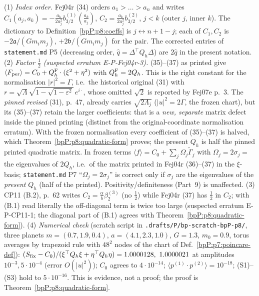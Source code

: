 \begin{remark}\label{bpP:p8:factor-half}\label{bpP:p8:dictionary}
(1) \emph{Index order.} Fej04r (34) orders $a_1>\dots>a_n$ and writes $C_1(a_j,a_k)=-\frac{a_k}{2a_j^2}b_{3/2}^{(1)}(\frac{a_k}{a_j})$, $C_2=\frac{a_k}{2a_j^2}b_{3/2}^{(2)}$, $j<k$ (outer $j$, inner $k$). The dictionary to Definition~\ref{bpP:p8:coeffs} is $j\leftrightarrow n+1-j$; each of $C_1,C_2$ is $-2\mathfrak a/(Gm_im_j)$, $+2\mathfrak b/(Gm_im_j)$ for the pair. The corrected entries of \texttt{statement.md} P5 (decreasing order, $\hat q=\Delta^{\top}Q_h\Delta$) are $2\hat q$ in the present notation.
(2) \emph{Factor $\tfrac12$ (suspected erratum E-P-Fej04r-3).} (35)--(37) as printed give $\langle F_{\rm per}\rangle=C_0+Q^{\rm F}_h\cdot(\xi^2+\eta^2)$ with $Q_h^{\rm F}=2Q_h$. This is the right constant for the normalisation $|r|^2=\Gamma$, i.e.\ the historical original (31) with $r=\sqrt{\Lambda}\sqrt{1-\sqrt{1-\varepsilon^2}}\,e^{i\cdot}$, whose omitted $\sqrt2$ is reported by Fej07e p.~3. The \emph{pinned revised} (31), p.~47, already carries $\sqrt{2\Lambda_j}$ ($|u|^2=2\Gamma$, the frozen chart), but its (35)--(37) retain the larger coefficients: that is a \emph{new, separate} matrix defect inside the pinned printing (distinct from the original-coordinate normalisation erratum). With the frozen normalisation every coefficient of (35)--(37) is halved, which Theorem~\ref{bpP:p8:quadratic-form} proves; the present $Q_h$ is half the pinned printed quadratic matrix. In frozen terms $\langle f\rangle=C_0+\sum_j\Omega_j\tilde\Gamma_j$ with $\Omega_j=2\sigma_j=$ the eigenvalues of $2Q_h$, i.e.\ of the matrix printed in Fej04r (36)--(37) in the $\xi$-basis; \texttt{statement.md} P7 ``$\Omega_j=2\sigma_j$'' is correct only if $\sigma_j$ are the eigenvalues of the \emph{present} $Q_h$ (half of the printed). Positivity/definiteness (Part~9) is unaffected.
(3) CP11 (B.2), p.~62 writes $C_2=\frac\alpha b\beta_2^{(3)}$ (no $\tfrac12$) while Fej04r (37) has $\tfrac12$ in $C_2$; with (B.1) read literally the off-diagonal term is twice too large (suspected erratum E-P-CP11-1; the diagonal part of (B.1) agrees with Theorem~\ref{bpP:p8:quadratic-form}).
(4) \emph{Numerical check} (scratch script in \texttt{.drafts/P/bp-scratch-bpP-p8/}, three planets $m=(0.7,1.9,0.4)$, $a=(4.1,2.3,1.0)$, $G=1.3$, $m_0=0.9$, torus averages by trapezoid rule with $48^2$ nodes of the chart of Def.~\ref{bpP:p7:poincare-def}): $(S_{\rm fix}-C_0)/(\xi^\top Q_h\xi+\eta^\top Q_h\eta)=1.0000128,\ 1.0000021$ at amplitudes $10^{-3},5\cdot10^{-4}$ (error $O(|u|^2)$); $C_0$ agrees to $4\cdot10^{-14}$; $\langle p^{(1)}\!\cdot p^{(2)}\rangle=10^{-18}$; (S1)--(S3) hold to $5\cdot10^{-16}$. This is evidence, not a proof; the proof is Theorem~\ref{bpP:p8:quadratic-form}.
\end{remark}

